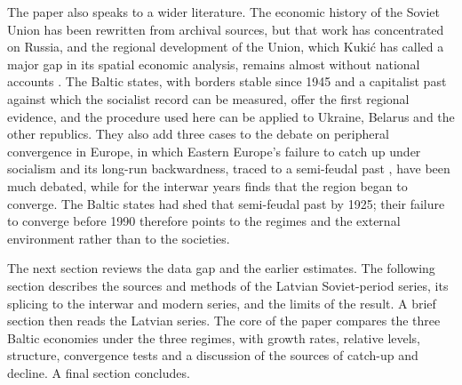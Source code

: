The paper also speaks to a wider literature. The economic history of the Soviet Union has been rewritten from archival sources, but that work has concentrated on Russia, and the regional development of the Union, which Kukić has called a major gap in its spatial economic analysis, remains almost without national accounts \parencites{zhuravskaya2024}[670]{kukic_soviet}. The Baltic states, with borders stable since 1945 and a capitalist past against which the socialist record can be measured, offer the first regional evidence, and the procedure used here can be applied to Ukraine, Belarus and the other republics. They also add three cases to the debate on peripheral convergence in Europe, in which Eastern Europe's failure to catch up under socialism \parencite[282]{vonyoinmorys2021} and its long-run backwardness, traced to a semi-feudal past \parencite[42--3]{berendregions2020}, have been much debated, while for the interwar years \textcite[163]{morysinterwarinmorys2021} finds that the region began to converge. The Baltic states had shed that semi-feudal past by 1925; their failure to converge before 1990 therefore points to the regimes and the external environment rather than to the societies.

The next section reviews the data gap and the earlier estimates. The following section describes the sources and methods of the Latvian Soviet-period series, its splicing to the interwar and modern series, and the limits of the result. A brief section then reads the Latvian series. The core of the paper compares the three Baltic economies under the three regimes, with growth rates, relative levels, structure, convergence tests and a discussion of the sources of catch-up and decline. A final section concludes.
